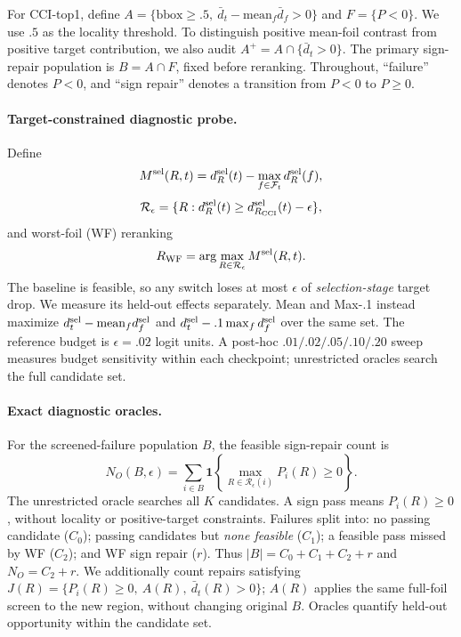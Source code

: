 \documentclass[10pt]{article}
\newcommand{\foils}{\mathcal F}
\newcommand{\regions}{\mathcal R}
\begin{document}
For CCI-top1, define
$A=\{\mathrm{bbox}\ge .5,\ \bar d_t-\mathrm{mean}_f\bar d_f>0\}$ and
$F=\{P<0\}$. We use $.5$ as the locality threshold. To distinguish positive mean-foil
contrast from positive target contribution, we also audit
$A^+=A\cap\{\bar d_t>0\}$. The primary sign-repair population is
$B=A\cap F$, fixed before reranking. Throughout, ``failure'' denotes $P<0$, and ``sign repair'' denotes a
transition from $P<0$ to $P\ge0$.

\paragraph{Target-constrained diagnostic probe.}
Define
\begin{equation}
M^{\rm sel}(R,t)=d_R^{\rm sel}(t)-\max_{f\in\foils_t}d_R^{\rm sel}(f),
\end{equation}
\begin{equation}
\regions_\epsilon=\{R:d_R^{\rm sel}(t)\ge d_{R_{\rm CCI}}^{\rm sel}(t)-\epsilon\},
\label{eq:feasible}
\end{equation}
and worst-foil (WF) reranking
\begin{equation}
R_{\rm WF}=\arg\max_{R\in\regions_\epsilon}M^{\rm sel}(R,t).
\label{eq:wf}
\end{equation}
The baseline is feasible, so any switch loses at most $\epsilon$ of
\emph{selection-stage} target drop. We measure its held-out effects separately.
Mean and Max-.1 instead maximize $d_t^{\rm sel}-\mathrm{mean}_f d_f^{\rm sel}$
and $d_t^{\rm sel}-.1\max_f d_f^{\rm sel}$ over the same set.
The reference budget is $\epsilon=.02$ logit units. A post-hoc
$.01/.02/.05/.10/.20$ sweep measures budget sensitivity within each
checkpoint; unrestricted oracles search the full candidate set.

\paragraph{Exact diagnostic oracles.}
For the screened-failure population $B$, the feasible sign-repair count is
\begin{equation}
N_O(B,\epsilon)=\sum_{i\in B}\mathbf1\!\left\{
\max_{R\in\regions_\epsilon(i)}P_i(R)\ge0\right\}.
\label{eq:oracle}
\end{equation}
The unrestricted oracle searches all $K$ candidates. A sign pass means
$P_i(R)\ge0$, without locality or positive-target constraints. Failures split
into: no passing candidate ($C_0$); passing candidates but \emph{none feasible}
($C_1$); a feasible pass missed by WF ($C_2$); and WF sign repair ($r$).
Thus $|B|=C_0+C_1+C_2+r$ and $N_O=C_2+r$. We additionally count repairs
satisfying $J(R)=\{P_i(R)\ge0,\ A(R),\ \bar d_t(R)>0\}$; $A(R)$ applies
the same full-foil screen to the new region, without changing original $B$.
Oracles quantify held-out opportunity within the candidate set.
\end{document}
